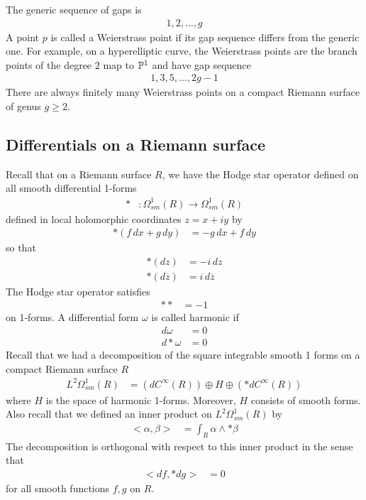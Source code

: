 \documentclass[12pt]{article}
\begin{document}
The generic sequence of gaps is \begin{align*}
    1, 2, \ldots, g
\end{align*} A point $p$ is called a Weierstrass point if its gap sequence differs from the generic one. For example, on a hyperelliptic curve, the Weierstrass points are the branch points of the degree $2$ map to $\P^1$ and have gap sequence \begin{align*}
    1, 3, 5, \ldots, 2g - 1
\end{align*} There are always finitely many Weierstrass points on a compact Riemann surface of genus $g \geq 2$.

\subsection{Differentials on a Riemann surface}
Recall that on a Riemann surface $R$, we have the Hodge star operator defined on all smooth differential 1-forms \begin{align*}
    * & : \Omega^1_{sm}(R) \to \Omega^1_{sm}(R)
\end{align*} defined in local holomorphic coordinates $z = x + iy$ by \begin{align*}
    *(f\,dx + g\,dy) & = -g\,dx + f\,dy
\end{align*} so that \begin{align*}
    *(dz) & = -i\, dz \\
    *(d\overline{z}) & = i\, d\overline{z}
\end{align*} The Hodge star operator satisfies \begin{align*}
    ** & = -1
\end{align*} on 1-forms. A differential form $\omega$ is called harmonic if \begin{align*}
    d\omega & = 0 \\
    d * \omega & = 0
\end{align*}
Recall that we had a decomposition of the square integrable smooth 1 forms on a compact Riemann surface $R$ \begin{align*}
    L^2 \Omega^1_{sm}(R) & = (dC^{\infty}(R)) \oplus H \oplus (*d C^{\infty}(R))
\end{align*} where $H$ is the space of harmonic 1-forms. Moreover, $H$ consists of smooth forms. Also recall that we defined an inner product on $L^2 \Omega^1_{sm}(R)$ by \begin{align*}
    <\alpha, \beta> & = \int_R \alpha \wedge * \beta
\end{align*} The decomposition is orthogonal with respect to this inner product in the sense that \begin{align*}
    <d f, * d g> & = 0
\end{align*} for all smooth functions $f,g$ on $R$.
\end{document}

